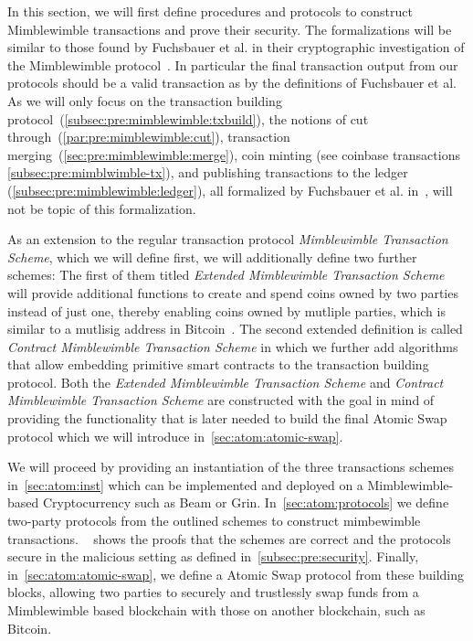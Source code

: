 In this section, we will first define procedures and protocols to construct Mimblewimble transactions and prove their security.
The formalizations will be similar to those found by Fuchsbauer et al. in their cryptographic investigation of the Mimblewimble protocol~\cite{fuchsbauer2019aggregate}.
In particular the final transaction output from our protocols should be a valid transaction as by the definitions of Fuchsbauer et al.
As we will only focus on the transaction building protocol~(\cref{subsec:pre:mimblewimble:txbuild}), the notions of cut through~(\cref{par:pre:mimblewimble:cut}), transaction merging~(\cref{sec:pre:mimblewimble:merge}), coin minting (see coinbase transactions \cref{subsec:pre:mimblwimble-tx}), and publishing transactions to the ledger (\cref{subsec:pre:mimblewimble:ledger}), all formalized by Fuchsbauer et al. in~\cite{fuchsbauer2019aggregate}, will not be topic of this formalization.

As an extension to the regular transaction protocol \emph{Mimblewimble Transaction Scheme}, which we will define first, we will additionally define two further schemes:
The first of them titled \emph{Extended Mimblewimble Transaction Scheme} will provide additional functions to create and spend coins owned by two parties instead of just one, thereby enabling coins owned by mutliple parties, which is similar to a mutlisig address in Bitcoin~\cite{antonopoulos2014mastering}.
The second extended definition is called \emph{Contract Mimblewimble Transaction Scheme} in which we further add algorithms that allow embedding primitive smart contracts to the transaction building protocol.
Both the \emph{Extended Mimblewimble Transaction Scheme} and \emph{Contract Mimblewimble Transaction Scheme} are constructed with the goal in mind of providing the functionality that is later needed to build the final Atomic Swap protocol which we will introduce in~\cref{sec:atom:atomic-swap}.

We will proceed by providing an instantiation of the three transactions schemes in~\cref{sec:atom:inst} which can be implemented and deployed on a Mimblewimble-based Cryptocurrency such as Beam or Grin.
In~\cref{sec:atom:protocols} we define two-party protocols from the outlined schemes to construct mimbewimble transactions.
~ shows the proofs that the schemes are correct and the protocols secure in the malicious setting as defined in~\cref{subsec:pre:security}.
Finally, in~\cref{sec:atom:atomic-swap}, we define a Atomic Swap protocol from these building blocks, allowing two parties to securely and trustlessly swap funds from a Mimblewimble based blockchain with those on another blockchain, such as Bitcoin.

